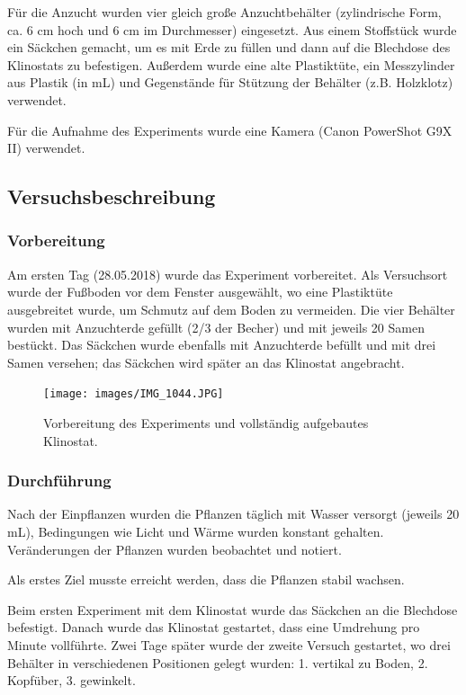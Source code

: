 \documentclass[
11pt, 
ngerman,
listof=totocnumbered,
oneside,
bibliography=totocnumbered,
abstracton
]{scrreprt}
\begin{document}
Für die Anzucht wurden vier gleich große Anzuchtbehälter (zylindrische Form, ca. 6 cm hoch und 6 cm im Durchmesser) eingesetzt. Aus einem Stoffstück wurde ein Säckchen gemacht, um es mit Erde zu füllen und dann auf die Blechdose des Klinostats zu befestigen. Außerdem wurde eine alte Plastiktüte, ein Messzylinder aus Plastik (in mL) und Gegenstände für Stützung der Behälter (z.B. Holzklotz) verwendet.

Für die Aufnahme des Experiments wurde eine Kamera (Canon PowerShot G9X II) verwendet.

\subsection{Versuchsbeschreibung}

\subsubsection{Vorbereitung}

Am ersten Tag (28.05.2018) wurde das Experiment vorbereitet. Als Versuchsort wurde der Fußboden vor dem Fenster ausgewählt, wo eine Plastiktüte ausgebreitet wurde, um Schmutz auf dem Boden zu vermeiden. Die vier Behälter wurden mit Anzuchterde gefüllt (2/3 der Becher) und mit jeweils 20 Samen bestückt. Das Säckchen wurde ebenfalls mit Anzuchterde befüllt und mit drei Samen versehen; das Säckchen wird später an das Klinostat angebracht. 

\begin{figure}[H]
	\centering 
	\texttt{[image: images/IMG\_1044.JPG]}
	\caption{Vorbereitung des Experiments und vollständig aufgebautes Klinostat.\label{Klinostat2}}
\end{figure}

\subsubsection{Durchführung}

Nach der Einpflanzen wurden die Pflanzen täglich mit Wasser versorgt (jeweils 20 mL), Bedingungen wie Licht und Wärme wurden konstant gehalten. Veränderungen der Pflanzen wurden beobachtet und notiert.

Als erstes Ziel musste erreicht werden, dass die Pflanzen stabil wachsen.

Beim ersten Experiment mit dem Klinostat wurde das Säckchen an die Blechdose befestigt. Danach wurde das Klinostat gestartet, dass eine Umdrehung pro Minute vollführte. Zwei Tage später wurde der zweite Versuch gestartet, wo drei Behälter in verschiedenen Positionen gelegt wurden: 1. vertikal zu Boden, 2. Kopfüber, 3. gewinkelt.
\end{document}
